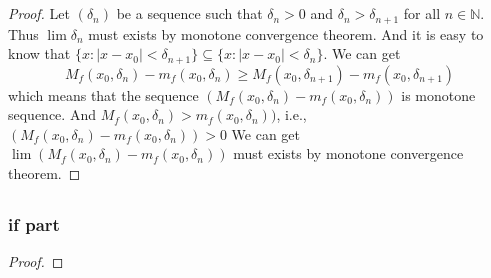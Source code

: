 \documentclass{article}
\begin{document}
    \section{}
        \subsection{}
            \begin{proof}
                Let $(\delta_n)$ be a sequence such that $\delta_n>0$ and $\delta_n>\delta_{n+1}$ for all $n\in\mathbb{N}$.
                Thus $\lim \delta_n$ must exists by monotone convergence theorem.
                And it is easy to know that $\{x:|x-x_0 |<\delta_{n+1}\}\subseteq\{x:|x-x_0 |<\delta_n\} $.
                We can get
                $$M_f(x_0,\delta_n)-m_f(x_0,\delta_n)\geq M_f(x_0,\delta_{n+1})-m_f(x_0,\delta_{n+1})$$
                which means that the sequence $(M_f(x_0,\delta_n)-m_f(x_0,\delta_n))$ is monotone sequence.
                And $M_f(x_0,\delta_n)>m_f(x_0,\delta_n))$, i.e., $(M_f(x_0,\delta_n)-m_f(x_0,\delta_n))>0$
                We can get $\lim (M_f(x_0,\delta_n)-m_f(x_0,\delta_n))$ must exists by monotone convergence theorem.
            \end{proof}
                
            
        \subsection{}
            \subsubsection*{if part}
            \begin{proof}
                
            \end{proof}
\end{document}
